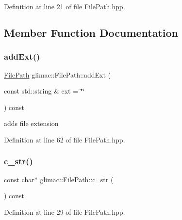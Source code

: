 Definition at line 21 of file File\+Path.\+hpp.



\subsection{Member Function Documentation}
\mbox{\label{classglimac_1_1_file_path_a4167275bb9a0239906a089a0c682ff37}} 
\subsubsection{\texorpdfstring{add\+Ext()}{addExt()}}
{\footnotesize\ttfamily \hyperlink{classglimac_1_1_file_path}{File\+Path} glimac\+::\+File\+Path\+::add\+Ext (\begin{DoxyParamCaption}\item[{const std\+::string \&}]{ext = {\ttfamily \char`\"{}\char`\"{}} }\end{DoxyParamCaption}) const\hspace{0.3cm}{\ttfamily [inline]}}

adds file extension 

Definition at line 62 of file File\+Path.\+hpp.

\mbox{\label{classglimac_1_1_file_path_ab2a882fca87897e8eb96ff6fb3b9f3dd}} 
\subsubsection{\texorpdfstring{c\+\_\+str()}{c\_str()}}
{\footnotesize\ttfamily const char$\ast$ glimac\+::\+File\+Path\+::c\+\_\+str (\begin{DoxyParamCaption}{ }\end{DoxyParamCaption}) const\hspace{0.3cm}{\ttfamily [inline]}}



Definition at line 29 of file File\+Path.\+hpp.

\mbox{\label{classglimac_1_1_file_path_a75d8d5573b69d79dd745513ddd4b158f}} 
